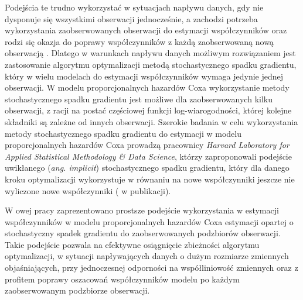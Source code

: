 Podejścia te trudno wykorzystać w sytuacjach napływu danych, gdy nie dysponuje się wszystkimi obserwacji jednocześnie, a zachodzi potrzeba wykorzystania zaobserwowanych obserwacji do estymacji współczynników oraz rodzi się okazja do poprawy współczynników z każdą zaobserwowaną nową obserwacją \cite{bottDOD}. Dlatego w warunkach napływu danych możliwym rozwiązaniem jest zastosowanie algorytmu optymalizacji metodą stochastycznego spadku gradientu, który w wielu modelach do estymacji współczynników wymaga jedynie jednej obserwacji. W modelu proporcjonalnych hazardów Coxa wykorzystanie metody stochastycznego spadku gradientu jest możliwe dla zaobserwowanych kilku obserwacji, z racji na postać częściowej funkcji log-wiarogodności, której kolejne składniki są zależne od innych obserwacji. Szerokie badania w celu wykorzystania metody stochastycznego spadku gradientu do estymacji w modelu proporcjonalnych hazardów Coxa prowadzą pracownicy \textit{Harvard Laboratory for Applied Statistical Methodology \& Data Science}, którzy zaproponowali podejście uwikłanego (\textit{ang. implicit}) stochastycznego spadku gradientu, który dla danego kroku optymalizacji wykorzystuje w równaniu na nowe współczynniki jeszcze nie wyliczone nowe współczynniki (\cite{toulis} w publikacji).  

 W owej pracy zaprezentowano prostsze podejście wykorzystania w estymacji współczynników w modelu proporcjonalnych hazardów Coxa estymacji opartej o stochastyczny spadek gradientu do zaobserwowanych podzbiorów obserwacji. Takie podejście pozwala na efektywne osiągnięcie zbieżności algorytmu optymalizacji, w sytuacji napływających danych o dużym rozmiarze zmiennych objaśniających, przy jednoczesnej odporności na współliniowość zmiennych oraz z profitem poprawy oszacowań współczynników modelu po każdym zaobserwowanym podzbiorze obserwacji.


